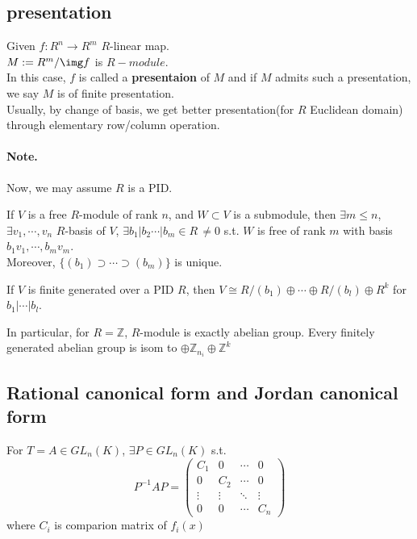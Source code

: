 \subsection{presentation}
Given  $ f:R^n\rightarrow R^m  $  $ R $-linear map.\\
 $ M:=R^m/\img f $ is  $ R-module $.\\
 In this case,  $ f  $ is called a \textbf{presentaion} of  $ M $
 and if  $ M  $ admits such a presentation, we say  $ M  $ is of finite presentation.\\
 Usually, by change of basis, we get better presentation(for  $ R  $ Euclidean domain) through elementary row/column operation.
 \paragraph{Note.}Now, we may assume  $ R  $ is a PID.    
 \begin{theorem}
    If  $ V  $ is a free  $ R $-module of rank  $ n  $, and  $ W\subset V  $ is a submodule, then  $ \exists m \leq n $,  $ \exists v_1,\cdots,v_n $  $ R $-basis of  $ V  $,  $ \exists b_1|b_2\cdots|b_m\in R \,\not=0$ s.t.  $ W  $ is free of rank  $ m  $ with basis  $ b_1v_1,\cdots,b_mv_m $.\\
    Moreover,  $ \{(b_1)\supset\cdots\supset(b_m )\} $ is unique.        
 \end{theorem}
 \begin{theorem}
    If  $ V  $ is finite generated over a  PID  $ R  $, then  $ V\cong R/(b_1)\oplus\cdots\oplus R/(b_l)\oplus R^k  $ for  $ b_1|\cdots|b_l $. 
 \end{theorem}
 In particular, for  $ R=\mathbb{Z} $,  $ R $-module is exactly abelian group. Every finitely generated abelian group is isom to  $ \oplus\mathbb{Z}_{n_i}\oplus \mathbb{Z}^k $   
 \subsection{Rational canonical form and Jordan canonical form}
 \begin{theorem}
    For  $ T=A\in GL_n(K) $,  $ \exists P\in GL_n(K) $ s.t.
    \[P^{-1}AP=\begin{pmatrix}
        C_1 & 0 & \cdots & 0\\
        0 & C_2 & \cdots & 0\\
        \vdots & \vdots & \ddots & \vdots\\
        0 & 0 & \cdots & C_n
    \end{pmatrix}\] 
    where  $ C_i $ is comparion matrix of  $ f_i(x) $ 
 \end{theorem}
